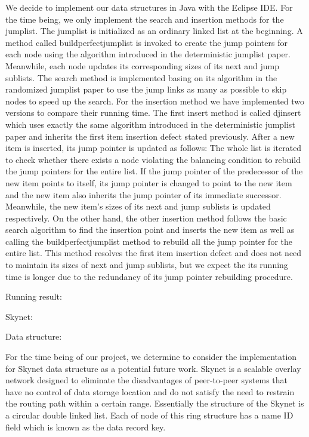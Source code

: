 \documentclass[oribibl]{llncs}
\begin{document}
We decide to implement our data structures in Java with the Eclipse IDE. For the time being, we only implement the search and insertion methods for the jumplist. The jumplist is initialized as an ordinary linked list at the beginning. A method called buildperfectjumplist is invoked to create the jump pointers for each node using the algorithm introduced in the deterministic jumplist paper. Meanwhile, each node updates its corresponding sizes of its next and jump sublists. The search method is implemented basing on its algorithm in the randomized jumplist paper to use the jump links as many as possible to skip nodes to speed up the search. For the insertion method we have implemented two versions to compare their running time. The first insert method is called djinsert which uses exactly the same algorithm introduced in the deterministic jumplist paper and inherits the first item insertion defect stated previously. After a new item is inserted, its jump pointer is updated as follows: The whole list is iterated to check whether there exists a node violating the balancing condition to rebuild the jump pointers for the entire list. If the jump pointer of the predecessor of the new item points to itself, its jump pointer is changed to point to the new item and the new item also inherits the jump pointer of its immediate successor. Meanwhile, the new item’s sizes of its next and jump sublists is updated respectively. On the other hand, the other insertion method follows the basic search algorithm to find the insertion point and inserts the new item as well as calling the buildperfectjumplist method to rebuild all the jump pointer for the entire list. This method resolves the first item insertion defect and does not need to maintain its sizes of next and jump sublists, but we expect the its running time is longer due to the redundancy of its jump pointer rebuilding procedure.

Running result:


Skynet:

Data structure:

For the time being of our project, we determine to consider the implementation for Skynet data structure as a potential future work. Skynet is a scalable overlay network designed to eliminate the disadvantages of peer-to-peer systems that have no control of data storage location and do not satisfy the need to restrain the routing path within a certain range. Essentially the structure of the Skynet is a circular double linked list. Each of node of this ring structure has a name ID field which is known as the data record key.  
\end{document}
